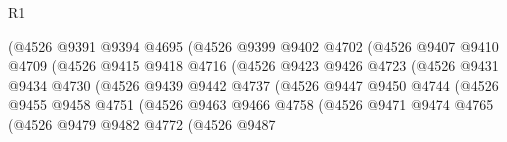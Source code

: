 \begin{lexlean}{R1}
\begin{coremodule}
                                  (@4526
                                    @9391
                                    @9394
                                    @4695
                                    (@4526
                                      @9399
                                      @9402
                                      @4702
                                      (@4526
                                        @9407
                                        @9410
                                        @4709
                                        (@4526
                                          @9415
                                          @9418
                                          @4716
                                          (@4526
                                            @9423
                                            @9426
                                            @4723
                                            (@4526
                                              @9431
                                              @9434
                                              @4730
                                              (@4526
                                                @9439
                                                @9442
                                                @4737
                                                (@4526
                                                  @9447
                                                  @9450
                                                  @4744
                                                  (@4526
                                                    @9455
                                                    @9458
                                                    @4751
                                                    (@4526
                                                      @9463
                                                      @9466
                                                      @4758
                                                      (@4526
                                                        @9471
                                                        @9474
                                                        @4765
                                                        (@4526
                                                          @9479
                                                          @9482
                                                          @4772
                                                          (@4526
                                                            @9487

\end{coremodule}
\end{lexlean}
